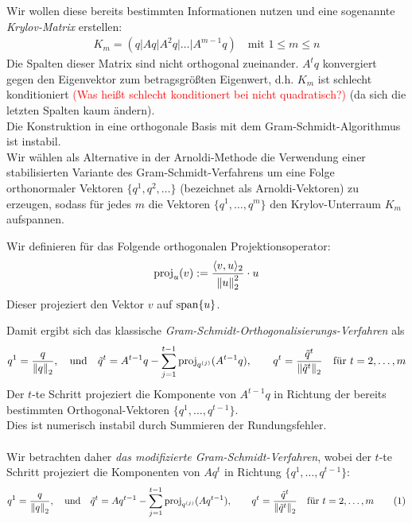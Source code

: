 Wir wollen diese bereits bestimmten Informationen nutzen und eine sogenannte \textit{Krylov-Matrix} erstellen:
%
\begin{align*}
  K_m = (q|Aq|A^2q|\dots|A^{m-1}q)
  \quad\text{mit }1\leq m\leq n
\end{align*}
%
Die Spalten dieser Matrix sind nicht orthogonal zueinander. $A^tq$ konvergiert gegen den Eigenvektor zum betragsgrößten
Eigenwert, d.h. $K_m$ ist schlecht konditioniert \textcolor{red}{(Was heißt schlecht konditionert bei nicht quadratisch?)} (da sich die letzten Spalten kaum ändern). \\
Die Konstruktion in eine orthogonale Basis mit dem Gram-Schmidt-Algorithmus ist instabil. \\
Wir wählen als Alternative in der Arnoldi-Methode die Verwendung einer stabilisierten Variante des 
Gram-Schmidt-Verfahrens um eine Folge orthonormaler Vektoren $\{q^1,q^2,\dots\}$ (bezeichnet als 
Arnoldi-Vektoren) zu erzeugen, sodass für jedes $m$ die Vektoren $\{q^1,\dots,q^m\}$ den Krylov-Unterraum $K_m$ 
aufspannen. 
\newpage
\begin{defbox}
Wir definieren für das Folgende orthogonalen Projektionsoperator:
\begin{align*}\text{proj}_u(v) := \dfrac{\langle v,u\rangle_2}{\vertn{2}{u}_2^2}\cdot u\end{align*}
Dieser projeziert den Vektor $v$ auf $\text{span}\{u\}$.
\end{defbox}
Damit ergibt sich das klassische \textit{Gram-Schmidt-Orthogonalisierungs-Verfahren} als 
\begin{align*}q^{1} = \dfrac{q}{\vertn{2}{q}_2},\quad\text{und}\quad\tilde{q}^{t} = A^{t-1}q - \sum_{j=1}^{t-1} \text{proj}_{q^{(j)}}(A^{t-1}q), 
\qquad q^t = \dfrac{\tilde{q}^t}{\vertn{2}{\tilde{q}^t}_2}\quad\text{für } t=2,\dots,m\end{align*}
Der $t$-te Schritt projeziert die Komponente von $A^{t-1}q$ in Richtung der bereits bestimmten Orthogonal-Vektoren 
$\{q^1,\dots,q^{t-1}\}$. \\
Dies ist numerisch instabil durch Summieren der Rundungsfehler. \\ \\
Wir betrachten daher \textit{das modifizierte Gram-Schmidt-Verfahren}, wobei der $t$-te Schritt projeziert die Komponenten
von $Aq^t$ in Richtung $\{q^1,\dots,q^{t-1}\}$:
\begin{align*}q^{1} = \dfrac{q}{\vertn{2}{q}_2},\quad\text{und}\quad\tilde{q}^{t} = Aq^{t-1} - \sum_{j=1}^{t-1} \text{proj}_{q^{(j)}}(Aq^{t-1}), 
\qquad q^t = \dfrac{\tilde{q}^t}{\vertn{2}{\tilde{q}^t}_2}\quad\text{für } t=2,\dots,m \tag{1}\end{align*}

